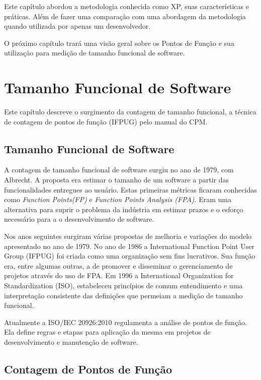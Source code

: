 Este capítulo abordou a metodologia conhecida como XP, suas características e práticas. Além de fazer uma comparação com uma abordagem da metodologia quando utilizada por apenas um desenvolvedor.

O próximo capítulo trará uma visão geral sobre os Pontos de Função e sua utilização para medição de tamanho funcional de software.


\chapter[Tamanho Funcional de Software]{Tamanho Funcional de Software}

Este capítulo descreve o surgimento da contagem de tamanho funcional, a técnica de contagem de pontos de função (IFPUG) pelo manual do CPM.

\section{Tamanho Funcional de Software}

A contagem de tamanho funcional de software surgiu no ano de 1979, com Albrecht. A proposta era estimar o tamanho de um software a partir das funcionalidades entregues ao usuário. Estas primeiras métricas ficaram conhecidas como \textit{Function Points(FP)} e \textit{Function Points Analysis (FPA)}. Eram uma alternativa para suprir o problema da indústria em estimar prazos e o esforço necessário para a o desenvolvimento de software. \cite{Gencel:2008}

Nos anos seguintes surgiram várias propostas de melhoria e variações do modelo apresentado no ano de 1979. No ano de 1986 a International Function Point User Group (IFPUG) foi criada como uma organização sem fins lucrativos. Sua função era, entre algumas outras, a de promover e disseminar o gerenciamento de projetos através do uso de FPA. Em 1996 a International Organization for Standardization (ISO), estabeleceu princípios de comum entendimento e uma interpretação consistente das  definições que permeiam a medição de tamanho funcional. \cite{Gencel:2008}

Atualmente a ISO/IEC 20926:2010 regulamenta a análise de pontos de função. Ela define regras e etapas para aplicação da mesma em projetos de desenvolvimento e manutenção de software. \cite{Marcos:2015}

\section{Contagem de Pontos de Função}

